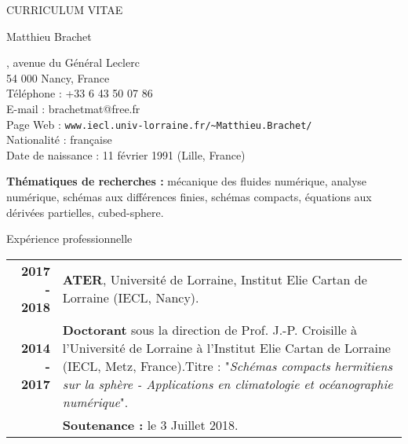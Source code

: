 \documentclass[10pt,a4paper]{report}
\def\cvpart{\noindent \hrulefill}
\def\sp{\vspace{6mm}}
\begin{document}
\begin{center}
{\selectfont
\begin{LARGE}
CURRICULUM VITAE
\end{LARGE}

\begin{large}
Matthieu Brachet
\end{large}

\hrulefill
}
\end{center}

, avenue du Général Leclerc\\
54 000 Nancy, France
\vspace{0.2cm}\\
Téléphone : +33 6 43 50 07 86\\
E-mail : brachetmat@free.fr\\
Page Web : \verb?www.iecl.univ-lorraine.fr/~Matthieu.Brachet/?
\vspace{0.2cm}\\
Nationalité : française\\
Date de naissance : 11 février 1991 (Lille, France)

\cvpart

\noindent
\textbf{Thématiques de recherches : } mécanique des fluides numérique, analyse numérique, schémas aux différences finies, schémas compacts, équations aux dérivées partielles, cubed-sphere.







\sp
{\selectfont
\begin{Large}
Expérience professionnelle
\end{Large}
\cvpart
}
\sp

\begin{center}
\begin{tabular}{r p{12cm}}
\textbf{2017 - 2018} & \textbf{ATER}, Université de Lorraine, Institut Elie Cartan de Lorraine (IECL, Nancy). \vspace{2mm}\\

\textbf{2014 - 2017} & \textbf{Doctorant} sous la direction de Prof. J.-P. Croisille à l'Université de Lorraine à l'Institut Elie Cartan de Lorraine (IECL, Metz, France).\newline Titre : "\textit{Schémas compacts hermitiens sur la sphère - Applications en climatologie et océanographie numérique}".\vspace{2mm}\\
	
	& \textbf{Soutenance :} le 3 Juillet 2018.\\
\end{tabular}
\end{center}
\end{document}
